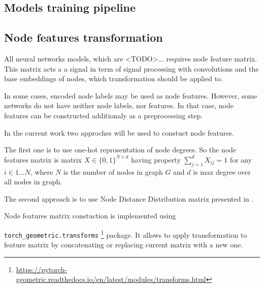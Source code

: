 \subsection{Models training pipeline}




\subsection{Node features transformation}



All neural networks models, which are  <TODO>... requires node feature matrix. This matrix
acts a a signal in term of signal processing with convolutions and the base embeddings of nodes,
which transformation should be applied to.

In some cases, encoded node labels may be used as node features. However, some networks 
do not have neither node labels, nor features.
In that case, node features can be constructed additionaly as a preprocessing step.

In the current work two approches will be used to constuct node features.

The first one is to use one-hot reprosentation of node degrees. So the node features matrix 
is matrix $X \in \{0,1\}^{N \times d}$ having property $\sum_{j=1}^{d}X_{ij} = 1$ for any $i \in 1 \dots N$,
where $N$ is the number of nodes in graph $G$ and $d$ is max degree over all nodes in graph.


The second approach is to use Node Distance Distribution matrix presented in \cite{Netpro2vec}.





Node features matrix constuction is implemented using

\texttt{torch\_geometric.transforms} \footnote{\url{https://pytorch-geometric.readthedocs.io/en/latest/modules/transforms.html}}
package. It allows to apply transformation to feature matrix by concatenating or replacing current matrix with a new one.

